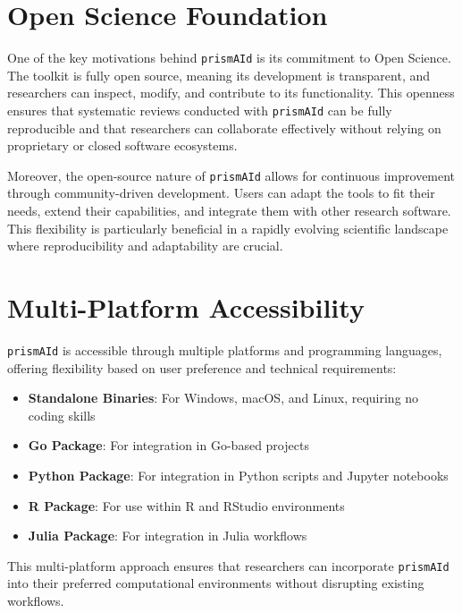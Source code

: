 \section{Open Science Foundation}

One of the key motivations behind \texttt{prismAId} is its commitment to Open Science. The toolkit is fully open source, meaning its development is transparent, and researchers can inspect, modify, and contribute to its functionality. This openness ensures that systematic reviews conducted with \texttt{prismAId} can be fully reproducible and that researchers can collaborate effectively without relying on proprietary or closed software ecosystems.

Moreover, the open-source nature of \texttt{prismAId} allows for continuous improvement through community-driven development. Users can adapt the tools to fit their needs, extend their capabilities, and integrate them with other research software. This flexibility is particularly beneficial in a rapidly evolving scientific landscape where reproducibility and adaptability are crucial.

\section{Multi-Platform Accessibility}

\texttt{prismAId} is accessible through multiple platforms and programming languages, offering flexibility based on user preference and technical requirements:

\begin{itemize}
    \item \textbf{Standalone Binaries}: For Windows, macOS, and Linux, requiring no coding skills
    \item \textbf{Go Package}: For integration in Go-based projects
    \item \textbf{Python Package}: For integration in Python scripts and Jupyter notebooks
    \item \textbf{R Package}: For use within R and RStudio environments
    \item \textbf{Julia Package}: For integration in Julia workflows
\end{itemize}

This multi-platform approach ensures that researchers can incorporate \texttt{prismAId} into their preferred computational environments without disrupting existing workflows.

